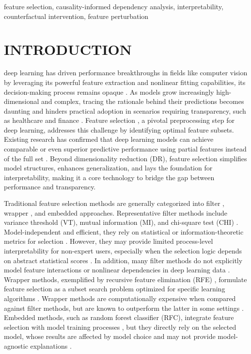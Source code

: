 \documentclass[journal]{IEEEtran}
\begin{document}
\begin{IEEEkeywords}
feature selection, causality-informed dependency analysis, interpretability, counterfactual intervention, feature perturbation 
\end{IEEEkeywords}

\section{INTRODUCTION}
 deep learning has driven performance breakthroughs in fields like computer vision \cite{matei2020deep} by leveraging its powerful feature extraction and nonlinear fitting capabilities, its decision-making process remains opaque \cite{sahin2025unlocking}. As models grow increasingly high-dimensional and complex, tracing the rationale behind their predictions becomes daunting and hinders practical adoption in scenarios requiring transparency, such as healthcare and finance \cite{rudin2019stop}. Feature selection \cite{saarela2021comparison}, a pivotal preprocessing step for deep learning, addresses this challenge by identifying optimal feature subsets. Existing research has confirmed that deep learning models can achieve comparable or even superior predictive performance using partial features instead of the full set \cite{dunn2021comparing}. Beyond dimensionality reduction (DR), feature selection simplifies model structures, enhances generalization, and lays the foundation for interpretability, making it a core technology to bridge the gap between performance and transparency.

Traditional feature selection methods are generally categorized into filter \cite{chandrashekar2014survey}, wrapper \cite{bolon2014review}, and embedded \cite{tang2014feature} approaches. Representative filter methods include variance threshold (VT), mutual information (MI), and chi-square test (CHI) \cite{matei2020deep}. Model-independent and efficient, they rely on statistical or information-theoretic metrics for selection \cite{brunato2016x}. However, they may provide limited process-level interpretability for non-expert users, especially when the selection logic depends on abstract statistical scores \cite{sahin2025unlocking}. In addition, many filter methods do not explicitly model feature interactions or nonlinear dependencies in deep learning data \cite{tsang2021interpretable}. Wrapper methods, exemplified by recursive feature elimination (RFE) \cite{chandrashekar2014survey}, formulate feature selection as a subset search problem optimized for specific learning algorithms \cite{sheikhpour2016particle}. Wrapper methods are computationally expensive when compared against filter methods, but are known to outperform the latter in some settings \cite{lee2020markov}. Embedded methods, such as random forest classifier (RFC), integrate feature selection with model training processes \cite{zhang2015embedded}, but they directly rely on the selected model, whose results are affected by model choice and may not provide model-agnostic explanations \cite{ang2015supervised}.
\end{document}
